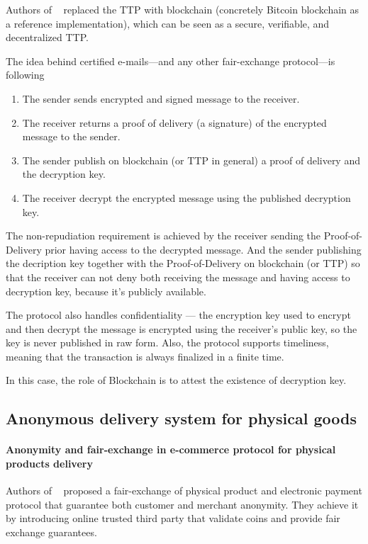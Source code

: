\documentclass{article}
\begin{document}
Authors of ~\cite{hinarejos2019solution} replaced the TTP with blockchain (concretely Bitcoin blockchain as a reference implementation), which can be seen as a secure, verifiable, and decentralized TTP.

The idea behind certified e-mails—and any other fair-exchange protocol—is following
\begin{enumerate}
    \item The sender sends encrypted and signed message to the receiver.
    \item The receiver returns a proof of delivery (a signature) of the encrypted message to the sender.
    \item The sender publish on blockchain (or TTP in general) a proof of delivery and the decryption key.
    \item The receiver decrypt the encrypted message using the published decryption key.
\end{enumerate}

The non-repudiation requirement is achieved by the receiver sending the Proof-of-Delivery prior having access to the decrypted message. And the sender publishing the decription key together with the Proof-of-Delivery on blockchain (or TTP) so that the receiver can not deny both receiving the message and having access to decryption key, because it's publicly available.

The protocol also handles confidentiality — the encryption key used to encrypt and then decrypt the message is encrypted using the receiver's public key, so the key is never published in raw form.
Also, the protocol supports timeliness, meaning that the transaction is always finalized in a finite time.

In this case, the role of Blockchain is to attest the existence of decryption key.


\subsection{Anonymous delivery system for physical goods}

\paragraph{Anonymity and fair-exchange in e-commerce protocol for physical products delivery}

Authors of ~\cite{birjoveanu2015anonymity} proposed a fair-exchange of physical product and electronic payment protocol that guarantee both customer and merchant anonymity. They achieve it by introducing online trusted third party that validate coins and provide fair exchange guarantees. 
\end{document}
